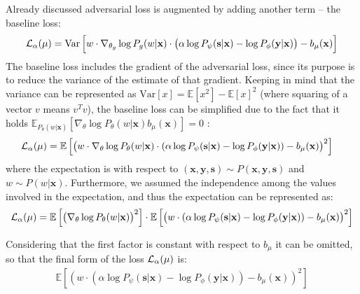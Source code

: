 \documentclass[preprint,12pt]{elsarticle}
\begin{document}
Already discussed adversarial loss is augmented by adding another term -- the baseline loss:
$${\cal L}_{\alpha}(\mu) = \mathrm{Var} \left[w\cdot \nabla_{\theta_g}\log P_g(w|\mathbf{x}) \cdot\left( \alpha \log P_\psi(\mathbf{s}|\mathbf{x}) - \log P_\phi(\mathbf{y}|\mathbf{x}) \right)
     - b_\mu(\mathbf{x}) \right]$$
The baseline loss includes the gradient of the adversarial loss, since its purpose is to reduce the variance of the estimate of that gradient.
Keeping in mind that the variance can be represented as $\mathrm{Var}[x] = \mathbb{E}[x^2] - \mathbb{E}[x]^2$ (where squaring of a vector $v$ means $v^Tv$), the baseline loss can be simplified due to the fact that it holds
$\mathbb{E}_{P_\theta(w|\mathbf{x})}[\nabla_{\theta}\log P_\theta(w|\mathbf{x}) b_\mu(\mathbf{x})]=0$ \cite{sutton2018reinforcement}:
\begin{gather*}
	\begin{split}
	&{\cal L}_{\alpha}(\mu) = \mathbb{E} \left[\left(w\cdot\nabla_{\theta}\log P_\theta(w|\mathbf{x})\cdot (\alpha \log P_\psi(\mathbf{s}|\mathbf{x}) - \log P_\phi(\mathbf{y}|\mathbf{x}))  - b_\mu(\mathbf{x})\right)^2 \right]
	\end{split}
\end{gather*}
where the expectation is with respect to $(\mathbf{x},\mathbf{y},\mathbf{s})\sim P(\mathbf{x},\mathbf{y},\mathbf{s})$ and $w\sim P(w|\mathbf{x})$.
Furthermore, we assumed the independence among the values involved in the expectation, and thus the expectation can be represented as:
\begin{equation*}
	\begin{split}
	{\cal L}_{\alpha}(\mu) = \mathbb{E} \left[\left(\nabla_{\theta}\log P_\theta(w|\mathbf{x})\right)^2 \right] \cdot \mathbb{E} \left[ \left(w \cdot (\alpha \log P_\psi(\mathbf{s}|\mathbf{x}) - \log P_\phi(\mathbf{y}|\mathbf{x})) - b_\mu(\mathbf{x})\right)^2 \right]
	\end{split}
\end{equation*}

Considering that the first factor is constant with respect to $b_\mu$ it can be omitted, so that the final form of the loss ${\cal L}_{\alpha}(\mu)$  is:
\begin{equation*}
\begin{split}
\mathbb{E} \left[\left(w \cdot (\alpha \log P_\psi(\mathbf{s}|\mathbf{x}) - \log P_\phi(\mathbf{y}|\mathbf{x})) - b_\mu(\mathbf{x})\right)^2\right]
\end{split}
\end{equation*}
\end{document}
